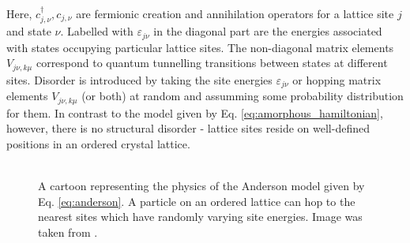 \documentclass[10pt,a4paper]{article}
\begin{document}
\begin{minipage}[t]{0.5\textwidth} 
Here, $c^\dagger_{j,\nu}, c_{j,\nu}$ are fermionic creation and annihilation operators for a lattice site $j$ and state $\nu$. Labelled with $\varepsilon_{j\nu}$ in the diagonal part are the energies associated with states occupying particular lattice sites. The non-diagonal matrix elements $V_{j\nu, k\mu}$ correspond to quantum tunnelling transitions between states at different sites. Disorder is introduced by taking the site energies $\varepsilon_{j\nu}$ or hopping matrix elements $V_{j\nu, k\mu}$ (or both) at random and assumming some probability distribution for them. In contrast to the model given by Eq. \eqref{eq:amorphous_hamiltonian}, however, there is no structural disorder - lattice sites reside on well-defined positions in an ordered crystal lattice. \\\\
\noindent  
\end{minipage}\hfill
\begin{minipage}[t]{0.45\textwidth}
\begin{figure}[H]
\caption{A cartoon representing the physics of the Anderson model given by Eq. \eqref{eq:anderson}. A particle on an ordered lattice can hop to the nearest sites which have randomly varying site energies. Image was taken from \cite{50yearsof}.}
\label{fig:anderson_hopping} 
\end{figure}
\end{minipage}
\end{document}
